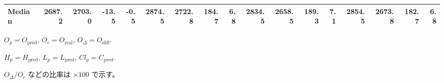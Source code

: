 \begin{threeparttable}
{\begin{tabular}{lrrrrrrrrrrrrrrrr}
 Median & 2687.2 & 2703.0 &      -13.5 &           -0.5 & 2874.5 & 2722.8 &      184.7 &            6.8 & 2834.5 & 2658.5 &      189.3 &            7.1 & 2854.5 & 2673.8 &       182.7 &              6.8 \\
\bottomrule
\end{tabular}
}
\begin{tablenotes}\footnotesize
\item $O_p=O_{\text{pred}}$, $O_r=O_{\text{real}}$, $O_\Delta=O_{\text{diff}}$.
\item $H_p=H_{\text{pred}}$, $L_p=L_{\text{pred}}$, $Cl_p=C_{\text{pred}}$.
\item $O_\Delta/O_r$ などの比率は \(\times100\) で示す。
\end{tablenotes}
\end{threeparttable}
\endgroup
